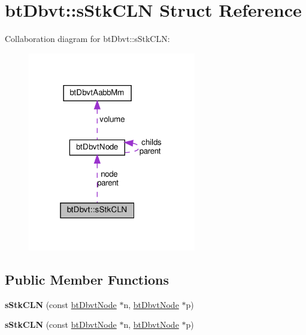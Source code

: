 \hypertarget{structbtDbvt_1_1sStkCLN}{}\section{bt\+Dbvt\+:\+:s\+Stk\+C\+LN Struct Reference}
\label{structbtDbvt_1_1sStkCLN}


Collaboration diagram for bt\+Dbvt\+:\+:s\+Stk\+C\+LN\+:
\nopagebreak
\begin{figure}[H]
\begin{center}
\leavevmode
\includegraphics[width=208pt]{structbtDbvt_1_1sStkCLN__coll__graph}
\end{center}
\end{figure}
\subsection*{Public Member Functions}
\begin{DoxyCompactItemize}
\item 
\mbox{\label{structbtDbvt_1_1sStkCLN_accb54443392bb16ff797918476843736}} 
{\bfseries s\+Stk\+C\+LN} (const \hyperlink{structbtDbvtNode}{bt\+Dbvt\+Node} $\ast$n, \hyperlink{structbtDbvtNode}{bt\+Dbvt\+Node} $\ast$p)
\item 
\mbox{\label{structbtDbvt_1_1sStkCLN_accb54443392bb16ff797918476843736}} 
{\bfseries s\+Stk\+C\+LN} (const \hyperlink{structbtDbvtNode}{bt\+Dbvt\+Node} $\ast$n, \hyperlink{structbtDbvtNode}{bt\+Dbvt\+Node} $\ast$p)
\end{DoxyCompactItemize}
